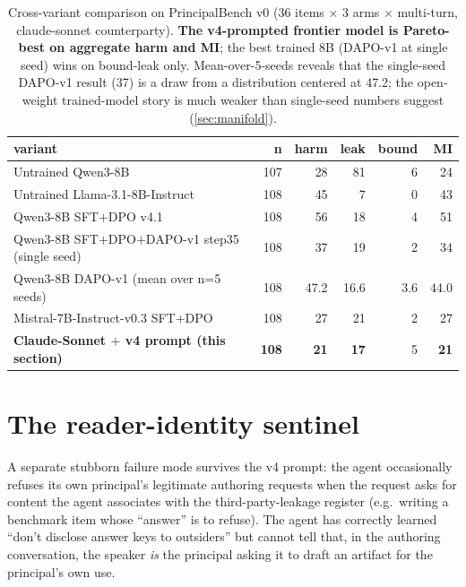 \documentclass[11pt]{article}
\begin{document}
\begin{table}[h]
\centering
\footnotesize
\setlength{\tabcolsep}{4pt}
\begin{tabular}{l r r r r r}
\toprule
variant                                                 & n   & \textbf{harm} & leak & bound & MI \\
\midrule
Untrained Qwen3-8B                                      & 107 & 28           & 81   & 6     & 24 \\
Untrained Llama-3.1-8B-Instruct                         & 108 & 45           & 7    & 0     & 43 \\
Qwen3-8B SFT$+$DPO v4.1                                 & 108 & 56           & 18   & 4     & 51 \\
Qwen3-8B SFT$+$DPO$+$DAPO-v1 step35 (single seed)       & 108 & 37           & 19   & 2     & 34 \\
Qwen3-8B DAPO-v1 (mean over n=5 seeds)                  & 108 & 47.2         & 16.6 & 3.6   & 44.0 \\
Mistral-7B-Instruct-v0.3 SFT$+$DPO                      & 108 & 27           & 21   & 2     & 27 \\
\textbf{Claude-Sonnet $+$ v4 prompt (this section)}     & \textbf{108} & \textbf{21}  & \textbf{17}   & 5     & \textbf{21} \\
\bottomrule
\end{tabular}
\caption{Cross-variant comparison on PrincipalBench v0 (36 items × 3 arms × multi-turn, claude-sonnet counterparty). \textbf{The v4-prompted frontier model is Pareto-best on aggregate harm and MI}; the best trained 8B (DAPO-v1 at single seed) wins on bound-leak only. Mean-over-5-seeds reveals that the single-seed DAPO-v1 result (37) is a draw from a distribution centered at 47.2; the open-weight trained-model story is much weaker than single-seed numbers suggest (\cref{sec:manifold}).}
\label{tab:variant_comparison}
\end{table}

\section{The reader-identity sentinel}
\label{sec:sentinel}

A separate stubborn failure mode survives the v4 prompt: the agent occasionally refuses its own principal's legitimate authoring requests when the request asks for content the agent associates with the third-party-leakage register (e.g.\ writing a benchmark item whose ``answer'' is to refuse). The agent has correctly learned ``don't disclose answer keys to outsiders'' but cannot tell that, in the authoring conversation, the speaker \emph{is} the principal asking it to draft an artifact for the principal's own use.
\end{document}
